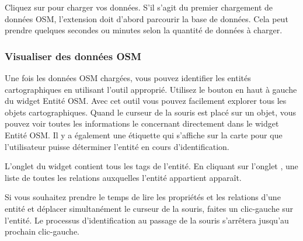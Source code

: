 Cliquez sur  pour charger vos données. S'il s'agit du premier chargement de données OSM, l'extension doit d'abord parcourir la base de données. Cela peut prendre quelques secondes ou minutes selon la quantité de données à charger.

\subsubsection{Visualiser des données OSM}

Une fois les données OSM chargées, vous pouvez identifier les entités cartographiques en utilisant l'outil approprié. Utilisez le bouton  en haut à gauche du widget Entité OSM. Avec cet outil vous pouvez facilement explorer tous les objets cartographiques. Quand le curseur de la souris est placé sur un objet, vous pouvez voir toutes les informations le concernant directement dans le widget Entité OSM. Il y a également une étiquette qui s'affiche sur la carte pour que l'utilisateur puisse déterminer l'entité en cours d'identification.

L'onglet  du widget contient tous les tags de l'entité. En cliquant sur l'onglet , une liste de toutes les relations auxquelles l'entité appartient apparaît.

Si vous souhaitez prendre le temps de lire les propriétés et les relations d'une entité et déplacer simultanément le curseur de la souris, faites un clic-gauche sur l'entité. Le processus d'identification au passage de la souris s'arrêtera jusqu'au prochain clic-gauche.

